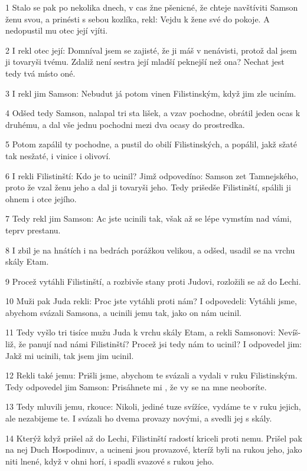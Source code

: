 \par 1 Stalo se pak po nekolika dnech, v cas žne pšenicné, že chteje navštíviti Samson ženu svou, a prinésti s sebou kozlíka, rekl: Vejdu k žene své do pokoje. A nedopustil mu otec její vjíti.
\par 2 I rekl otec její: Domníval jsem se zajisté, že ji máš v nenávisti, protož dal jsem ji tovaryši tvému. Zdaliž není sestra její mladší peknejší než ona? Nechat jest tedy tvá místo oné.
\par 3 I rekl jim Samson: Nebudut já potom vinen Filistinským, když jim zle uciním.
\par 4 Odšed tedy Samson, nalapal tri sta lišek, a vzav pochodne, obrátil jeden ocas k druhému, a dal vše jednu pochodni mezi dva ocasy do prostredka.
\par 5 Potom zapálil ty pochodne, a pustil do obilí Filistinských, a popálil, jakž sžaté tak nesžaté, i vinice i olivoví.
\par 6 I rekli Filistinští: Kdo je to ucinil? Jimž odpovedíno: Samson zet Tamnejského, proto že vzal ženu jeho a dal ji tovaryši jeho. Tedy prišedše Filistinští, spálili ji ohnem i otce jejího.
\par 7 Tedy rekl jim Samson: Ac jste ucinili tak, však až se lépe vymstím nad vámi, teprv prestanu.
\par 8 I zbil je na hnátích i na bedrách porážkou velikou, a odšed, usadil se na vrchu skály Etam.
\par 9 Procež vytáhli Filistinští, a rozbivše stany proti Judovi, rozložili se až do Lechi.
\par 10 Muži pak Juda rekli: Proc jste vytáhli proti nám? I odpovedeli: Vytáhli jsme, abychom svázali Samsona, a ucinili jemu tak, jako on nám ucinil.
\par 11 Tedy vyšlo tri tisíce mužu Juda k vrchu skály Etam, a rekli Samsonovi: Nevíš-liž, že panují nad námi Filistinští? Procež jsi tedy nám to ucinil? I odpovedel jim: Jakž mi ucinili, tak jsem jim ucinil.
\par 12 Rekli také jemu: Prišli jsme, abychom te svázali a vydali v ruku Filistinským. Tedy odpovedel jim Samson: Prisáhnete mi , že vy se na mne neoboríte.
\par 13 Tedy mluvili jemu, rkouce: Nikoli, jediné tuze svížíce, vydáme te v ruku jejich, ale nezabijeme te. I svázali ho dvema provazy novými, a svedli jej s skály.
\par 14 Kterýž když prišel až do Lechi, Filistinští radostí kriceli proti nemu. Prišel pak na nej Duch Hospodinuv, a ucineni jsou provazové, kteríž byli na rukou jeho, jako niti lnené, když v ohni horí, i spadli svazové s rukou jeho.
